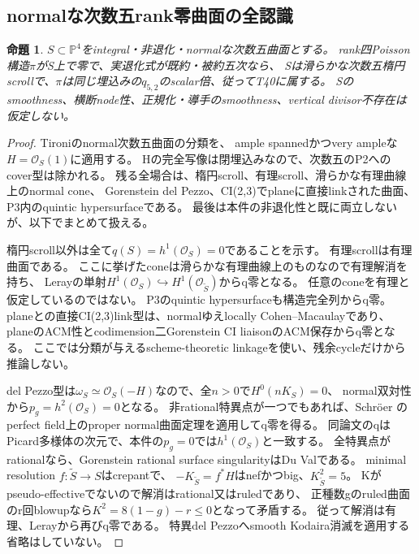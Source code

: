 \documentclass[a4paper,11pt]{ltjsarticle}
\newtheorem{proposition}{命題}[section]
\theoremstyle{definition}
\begin{document}
\subsection{normalな次数五rank零曲面の全認識}
\begin{proposition}\label{prop:normal-degree-five-rank-zero}
$S\subset\mathbb P^4$をintegral・非退化・normalな次数五曲面とする。
rank四Poisson構造$\pi$がS上で零で、実退化式が既約・被約五次なら、
Sは滑らかな次数五楕円scrollで、$\pi$は同じ埋込みの$q_{5,2}$のscalar倍、従ってT40に属する。
Sのsmoothness、横断node性、正規化・導手のsmoothness、vertical divisor不存在は仮定しない。
\end{proposition}
\begin{proof}
Tironi\cite[Proposition 2, pp.6--7]{tironi5}のnormal次数五曲面の分類を、
ample spannedかつvery ampleな$H=\mathcal O_S(1)$に適用する。
Hの完全写像は閉埋込みなので、次数五のP2へのcover型は除かれる。
残る全場合は、楕円scroll、有理scroll、滑らかな有理曲線上のnormal cone、
Gorenstein del Pezzo、CI(2,3)でplaneに直接linkされた曲面、P3内のquintic hypersurfaceである。
最後は本件の非退化性と既に両立しないが、以下でまとめて扱える。

楕円scroll以外は全て$q(S)=h^1(\mathcal O_S)=0$であることを示す。
有理scrollは有理曲面である。
ここに挙げたconeは滑らかな有理曲線上のものなので有理解消を持ち、
Lerayの単射$H^1(\mathcal O_S)\hookrightarrow H^1(\mathcal O_{\widetilde S})$からq零となる。
任意のconeを有理と仮定しているのではない。
P3のquintic hypersurfaceも構造完全列からq零。
planeとの直接CI(2,3)link型は、normalゆえlocally Cohen--Macaulayであり、
planeのACM性とcodimension二Gorenstein CI liaisonのACM保存からq零となる。
ここでは分類が与えるscheme-theoretic linkageを使い、残余cycleだけから推論しない。

del Pezzo型は$\omega_S\simeq\mathcal O_S(-H)$なので、全$n>0$で$H^0(nK_S)=0$、
normal双対性から$p_g=h^2(\mathcal O_S)=0$となる。
非rational特異点が一つでもあれば、Schr\"oer\cite[Theorem 2.2, pp.4--5]{schroeer}
のperfect field上のproper normal曲面定理を適用してq零を得る。
同論文のqはPicard多様体の次元で、本件の$p_g=0$では$h^1(\mathcal O_S)$と一致する。
全特異点がrationalなら、Gorenstein rational surface singularityはDu Valである。
minimal resolution $f:\widetilde S\to S$はcrepantで、
$-K_{\widetilde S}=f^*H$はnefかつbig、$K_{\widetilde S}^2=5$。
Kがpseudo-effectiveでないので解消はrational又はruledであり、
正種数gのruled曲面のr回blowupなら$K^2=8(1-g)-r\le0$となって矛盾する。
従って解消は有理、Lerayから再びq零である。
特異del Pezzoへsmooth Kodaira消滅を適用する省略はしていない。


\end{proof}
\end{document}
